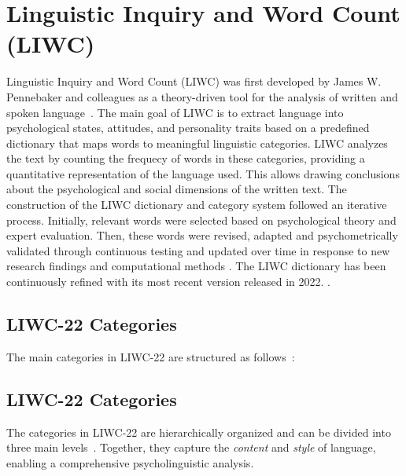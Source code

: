\section{Linguistic Inquiry and Word Count (LIWC)}
Linguistic Inquiry and Word Count (LIWC) was first developed by James W. Pennebaker and colleagues as a theory-driven tool for the analysis of written and spoken language~\cite{tausczik2010psychological}. 
The main goal of LIWC is to extract language into psychological states, attitudes, and personality traits based on a predefined dictionary that maps words to meaningful linguistic categories. LIWC analyzes the text by counting the frequecy of words in these categories, providing a quantitative representation of the language used. This allows drawing conclusions about the psychological and social dimensions of the written text.
The construction of the LIWC dictionary and category system followed an iterative process. Initially, relevant words were selected based on psychological theory and expert evaluation. Then, these words were revised, adapted and psychometrically validated through continuous testing and updated over time in response to new research findings and computational methods \cite{tausczik2010psychological}. The LIWC dictionary has been continuously refined with its most recent version released in 2022. \parencite{pennebaker2022liwc}.


\subsection{LIWC-22 Categories}
The main categories in LIWC-22 are structured as follows~\cite{pennebaker2022liwc}:

\subsection{LIWC-22 Categories}

The categories in LIWC-22 are hierarchically organized and can be divided into three main levels~\cite{boyd2022liwc22,tausczik2010psychological}. Together, they capture the \textit{content} and \textit{style} of language, enabling a comprehensive psycholinguistic analysis.

